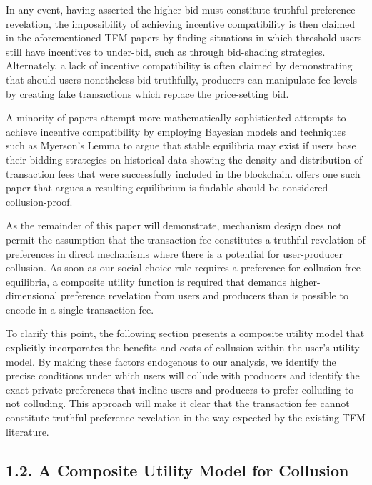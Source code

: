 \documentclass[oneside]{article}   	%
\begin{document}
In any event, having asserted the higher bid must constitute truthful preference revelation, the impossibility of achieving incentive compatibility is then claimed in the aforementioned TFM papers by finding situations in which threshold users still have incentives to under-bid, such as through bid-shading strategies. Alternately, a lack of incentive compatibility is often claimed by demonstrating that should users nonetheless bid truthfully, producers can manipulate fee-levels by creating fake transactions which replace the price-setting bid.

A minority of papers attempt more mathematically sophisticated attempts to achieve incentive compatibility by employing Bayesian models and techniques such as Myerson's Lemma to argue that stable equilibria may exist if users base their bidding strategies on historical data showing the density and distribution of transaction fees that were successfully included in the blockchain. \cite{chen2022bayesian} offers one such paper that argues a resulting equilibrium is findable should be considered collusion-proof.

As the remainder of this paper will demonstrate, mechanism design does not permit the assumption that the transaction fee constitutes a truthful revelation of preferences in direct mechanisms where there is a potential for user-producer collusion. As soon as our social choice rule requires a preference for collusion-free equilibria, a composite utility function is required that demands higher-dimensional preference revelation from users and producers than is possible to encode in a single transaction fee.

To clarify this point, the following section presents a composite utility model that explicitly incorporates the benefits and costs of collusion within the user's utility model. By making these factors endogenous to our analysis, we identify the precise conditions under which users will collude with producers and identify the exact private preferences that incline users and producers to prefer colluding to not colluding. This approach will make it clear that the transaction fee cannot constitute truthful preference revelation in the way expected by the existing TFM literature.

\subsection*{1.2. A Composite Utility Model for Collusion}
\vspace{0.5em}
\end{document}
